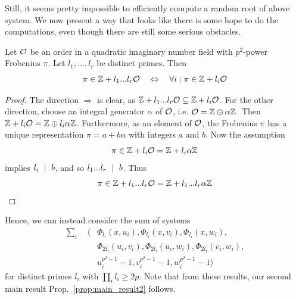 Still, it seems pretty impossible to efficiently compute a random root of above system.
We now present a way that looks like there is some hope to do the computations, even though there are still some serious obstacles.
\begin{prop}
    Let $\mathcal{O}$ be an order in a quadratic imaginary number field with $p^2$-power Frobenius $\pi$.
    Let $l_1, ..., l_r$ be distinct primes.
    Then
    \begin{equation*}
        \pi \in \mathbb{Z} + l_1 ... l_r \mathcal{O} \quad \Leftrightarrow \quad \forall i: \pi \in \mathbb{Z} + l_i \mathcal{O}
    \end{equation*}
\end{prop}
\begin{proof}
    The direction $\Rightarrow$ is clear, as $\mathbb{Z} + l_1 ... l_r \mathcal{O} \subseteq \mathbb{Z} + l_i\mathcal{O}$.
    For the other direction, choose an integral generator $\alpha$ of $\mathcal{O}$, i.e. $\mathcal{O} = \mathbb{Z} \oplus \alpha\mathbb{Z}$.
    Then $\mathbb{Z} + l_i\mathcal{O} = \mathbb{Z} \oplus l_i\alpha\mathbb{Z}$.
    Furthermore, as an element of $\mathcal{O}$, the Frobenius $\pi$ has a unique representation $\pi = a + b\alpha$ with integers $a$ and $b$.
    Now the assumption
    \begin{equation*}
        \pi \in \mathbb{Z} + l_i\mathcal{O} = \mathbb{Z} + l_i\alpha\mathbb{Z}
    \end{equation*}
    implies $l_i \ \mid \  b$, and so $l_1 ... l_r \ \mid \  b$.
    Thus
    \begin{equation*}
        \pi \in \mathbb{Z} + l_1 ... l_r \mathcal{O} = \mathbb{Z} + l_1 ... l_r \alpha \mathbb{Z} \qedhere
    \end{equation*}
\end{proof}
Hence, we can instead consider the sum of systems
\begin{align*}
    \sum_i \quad \langle &\Phi_{l_i}(x, u_i), \Phi_{l_i}(x, v_i), \Phi_{l_i}(x, w_i), \\
    &\Phi_{2l_i}(u_i, v_i), \Phi_{2l_i}(u_i, w_i), \Phi_{2l_i}(v_i, w_i), \\
    &u_i^{p^2 - 1} - 1, v_i^{p^2 - 1} - 1, w_i^{p^2 - 1} - 1 \rangle 
\end{align*}
for distinct primes $l_i$ with $\prod_i l_i \geq 2p$.
Note that from these results, our second main result Prop.~\ref{prop:main_result2} follows.


